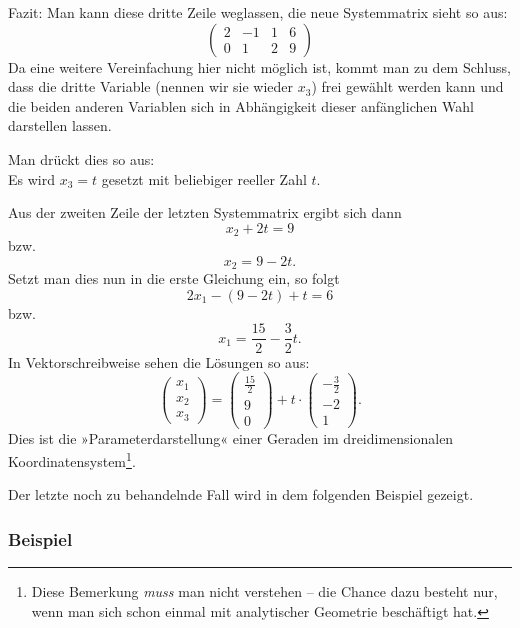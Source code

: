 Fazit: Man kann diese dritte Zeile weglassen, die neue Systemmatrix sieht so aus:
\[ \left(\begin{array}{ccc|c} 2 & -1 & 1 & 6\\ 0 & 1 & 2 & 9 \end{array}\right) \]
Da eine weitere Vereinfachung hier nicht möglich ist, kommt man zu dem Schluss, dass die dritte Variable (nennen wir sie wieder $x_3$) frei gewählt werden kann und die beiden anderen Variablen sich in Abhängigkeit dieser anfänglichen Wahl darstellen lassen.

Man drückt dies so aus:\\
Es wird $x_3 = t$ gesetzt mit beliebiger reeller Zahl $t$.

Aus der zweiten Zeile der letzten Systemmatrix ergibt sich dann
\[ x_2 + 2t = 9 \]
bzw.
\[ x_2 = 9 - 2t . \]
Setzt man dies nun in die erste Gleichung ein, so folgt
\[ 2x_1 - (9 - 2t) + t = 6 \]
bzw.
\[ x_1 = \frac{15}{2} - \frac{3}{2} t . \]
In Vektorschreibweise sehen die Lösungen so aus:
\[ \begin{pmatrix} x_1 \\ x_2 \\ x_3 \end{pmatrix} = \begin{pmatrix} \frac{15}{2} \\ 9 \\ 0 \end{pmatrix} + t \cdot \begin{pmatrix} -\frac{3}{2} \\ -2 \\ 1 \end{pmatrix} . \]
Dies ist die »Parameterdarstellung« einer Geraden im dreidimensionalen Koordinatensystem\footnote{Diese Bemerkung \emph{muss} man nicht verstehen -- die Chance dazu besteht nur, wenn man sich schon einmal mit analytischer Geometrie beschäftigt hat.}.\beispielende

Der letzte noch zu behandelnde Fall wird in dem folgenden Beispiel gezeigt.

\subsubsection{Beispiel}

